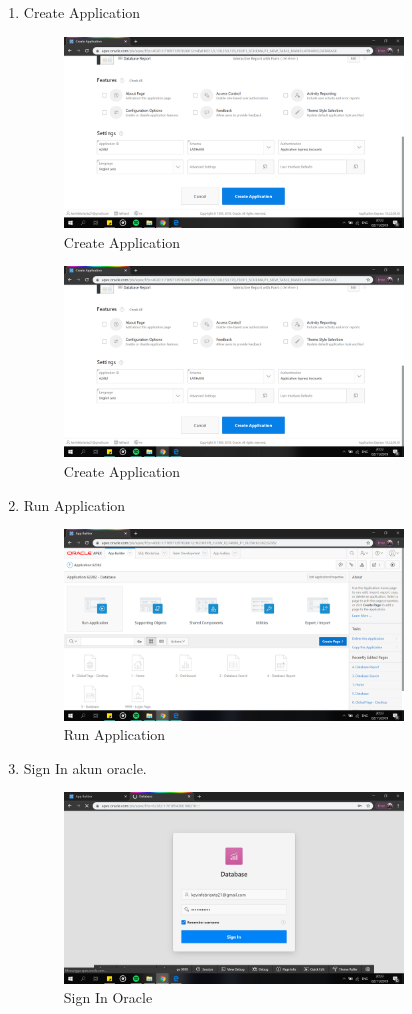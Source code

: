 \begin{enumerate}
\item  Create Application
    \begin{figure}[!htbp]
    \centering
    \includegraphics[width=9cm]{picture/11.png}
    \caption{Create Application}
    \end{figure}

\newpage    
    \begin{figure}[!htbp]
    \centering
    \includegraphics[width=9cm]{picture/11.png}
    \caption{Create Application}
    \end{figure}
        
\item Run Application
    \begin{figure}[!htbp]
    \centering
    \includegraphics[width=9cm]{picture/12.png}
    \caption{Run Application}
    \end{figure}
    
\item Sign In akun oracle.
    \begin{figure}[!htbp]
    \centering
    \includegraphics[width=9cm]{picture/13.png}
    \caption{Sign In Oracle}
    \end{figure}
    

\end{enumerate}
